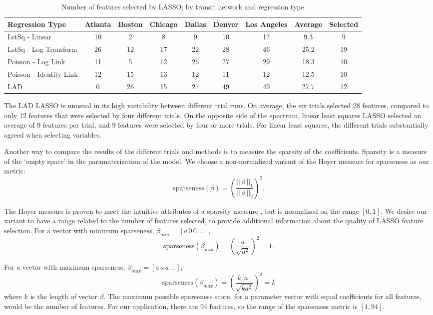 \documentclass[11pt]{article}
\begin{document}
\begin{table}[H]
\begingroup\fontsize{10}{15}\selectfont
\centering
\begin{tabular}{l|cccccc|cc}
Regression Type&Atlanta&Boston&Chicago&Dallas&Denver&Los Angeles&Average&Selected\\
\midrule
LstSq - Linear&10&2&8&9&10&17&9.3&9\\
LstSq - Log Transform&26&12&17&22&28&46&25.2&19\\
Poisson - Log Link&11&5&12&26&27&29&18.3&10\\
Poisson - Identity Link&12&15&13&12&11&12&12.5&10\\
LAD&0&26&15&27&49&49&27.7&12\\
\end{tabular}
\caption{Number of features selected by LASSO; by transit network and regression type}\label{tab:lassoFeat0Norm}
\endgroup
\end{table}



The LAD LASSO is unusual in its high variability between different trial runs. On average, the six trials selected 28 features, compared to only 12 features that were selected by four different trials. On the opposite side of the spectrum, linear least squares LASSO selected an average of 9 features per trial, and 9 features were selected by four or more trials. For linear least squares, the different trials substantially agreed when selecting variables.

Another way to compare the results of the different trials and methods is to measure the sparsity  of the coefficients. Sparsity is a measure of the `empty space' in the paramaterization of the model. We choose a non-normalized variant of the Hoyer measure for sparseness \cite{Hoyer2004} as our metric: 
$$\text{sparseness}(\beta) = \left(\frac{||\,\beta\,||_1}{||\,\beta\,||_2}\right)^2.$$

The Hoyer measure is proven to meet the intuitive attributes of a sparsity measure \cite{Hurley2009}, but is normalized on the range $[0, 1]$. We desire our variant to have a range related to the number of features selected, to provide additional information about the quality of LASSO feature selection. For a vector with minimum sparseness, $\beta_{min} = \left[a\,0\,0\, ...\right]$, 
\[\text{sparseness}(\beta_{min}) = \left(\frac{|\,a\,|}{\sqrt{a^2}}\right)^2 = 1.\]

For a vector with maximum sparseness, $\beta_{max} = \left[a\,a\,a\,...\right]$,
\[\text{sparseness}(\beta_{max}) = \left(\frac{k|\,a\,|}{\sqrt{ka^2}}\right)^2 = k\] where $k$ is the length of vector $\beta$. The maximum possible sparseness score, for a parameter vector with equal coefficients for all features, would be the number of features. For our application, there are 94 features, so the range of the sparseness metric is $[1, 94]$.
\end{document}
